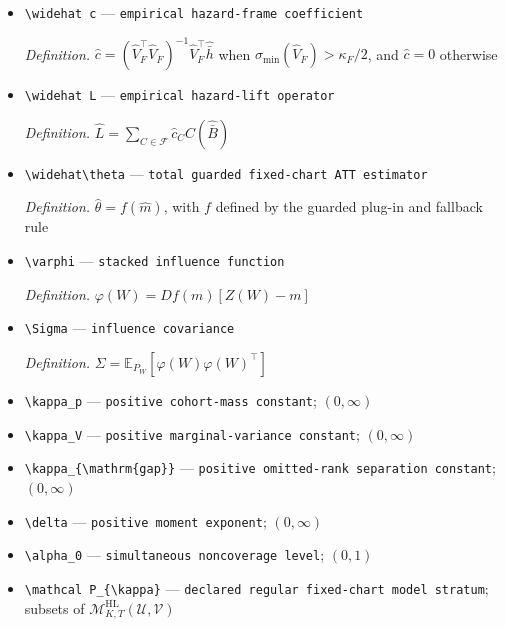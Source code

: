 \documentclass{article}
\begin{document}
\begin{itemize}
  \item \texttt{\textbackslash{}\allowbreak{}widehat c} --- \texttt{empirical hazard-\allowbreak{}frame coefficient}
  \par\smallskip\noindent\emph{Definition.} \(\widehat c=(\widehat V_F^{\top}\widehat V_F)^{-1}\widehat V_F^{\top}\widehat{\bar h}\) when \(\sigma_{\min}(\widehat V_F)>\kappa_F/2\), and \(\widehat c=0\) otherwise
  \item \texttt{\textbackslash{}\allowbreak{}widehat L} --- \texttt{empirical hazard-\allowbreak{}lift operator}
  \par\smallskip\noindent\emph{Definition.} \(\widehat L=\sum_{C\in\mathcal F}\widehat c_C C(\widehat{\bar B})\)
  \item \texttt{\textbackslash{}\allowbreak{}widehat\textbackslash{}\allowbreak{}theta} --- \texttt{total guarded fixed-\allowbreak{}chart ATT estimator}
  \par\smallskip\noindent\emph{Definition.} \(\widehat\theta=f(\widehat m)\), with \(f\) defined by the guarded plug-in and fallback rule
  \item \texttt{\textbackslash{}\allowbreak{}varphi} --- \texttt{stacked influence function}
  \par\smallskip\noindent\emph{Definition.} \(\varphi(W)=Df(m)[Z(W)-m]\)
  \item \texttt{\textbackslash{}\allowbreak{}Sigma} --- \texttt{influence covariance}
  \par\smallskip\noindent\emph{Definition.} \(\Sigma=\mathbb E_{P_W}[\varphi(W)\varphi(W)^{\top}]\)
  \item \texttt{\textbackslash{}\allowbreak{}kappa\_\allowbreak{}p} --- \texttt{positive cohort-\allowbreak{}mass constant}; \((0,\infty)\)
  \item \texttt{\textbackslash{}\allowbreak{}kappa\_\allowbreak{}V} --- \texttt{positive marginal-\allowbreak{}variance constant}; \((0,\infty)\)
  \item \texttt{\textbackslash{}\allowbreak{}kappa\_\allowbreak{}\{\textbackslash{}\allowbreak{}mathrm\{gap\}\allowbreak{}\}\allowbreak{}} --- \texttt{positive omitted-\allowbreak{}rank separation constant}; \((0,\infty)\)
  \item \texttt{\textbackslash{}\allowbreak{}delta} --- \texttt{positive moment exponent}; \((0,\infty)\)
  \item \texttt{\textbackslash{}\allowbreak{}alpha\_\allowbreak{}0} --- \texttt{simultaneous noncoverage level}; \((0,1)\)
  \item \texttt{\textbackslash{}\allowbreak{}mathcal P\_\allowbreak{}\{\textbackslash{}\allowbreak{}kappa\}\allowbreak{}} --- \texttt{declared regular fixed-\allowbreak{}chart model stratum}; subsets of \(\mathcal M^{\mathrm{HL}}_{K,T}(\mathcal U,\mathcal V)\)

\end{itemize}
\end{document}
